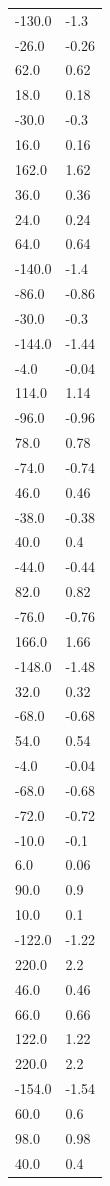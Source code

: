 \begin{longtable}{ll}
-130.0 & -1.3 \\
-26.0 & -0.26 \\
62.0 & 0.62 \\
18.0 & 0.18 \\
-30.0 & -0.3 \\
16.0 & 0.16 \\
162.0 & 1.62 \\
36.0 & 0.36 \\
24.0 & 0.24 \\
64.0 & 0.64 \\
-140.0 & -1.4 \\
-86.0 & -0.86 \\
-30.0 & -0.3 \\
-144.0 & -1.44 \\
-4.0 & -0.04 \\
114.0 & 1.14 \\
-96.0 & -0.96 \\
78.0 & 0.78 \\
-74.0 & -0.74 \\
46.0 & 0.46 \\
-38.0 & -0.38 \\
40.0 & 0.4 \\
-44.0 & -0.44 \\
82.0 & 0.82 \\
-76.0 & -0.76 \\
166.0 & 1.66 \\
-148.0 & -1.48 \\
32.0 & 0.32 \\
-68.0 & -0.68 \\
54.0 & 0.54 \\
-4.0 & -0.04 \\
-68.0 & -0.68 \\
-72.0 & -0.72 \\
-10.0 & -0.1 \\
6.0 & 0.06 \\
90.0 & 0.9 \\
10.0 & 0.1 \\
-122.0 & -1.22 \\
220.0 & 2.2 \\
46.0 & 0.46 \\
66.0 & 0.66 \\
122.0 & 1.22 \\
220.0 & 2.2 \\
-154.0 & -1.54 \\
60.0 & 0.6 \\
98.0 & 0.98 \\
40.0 & 0.4 \\

\end{longtable}
